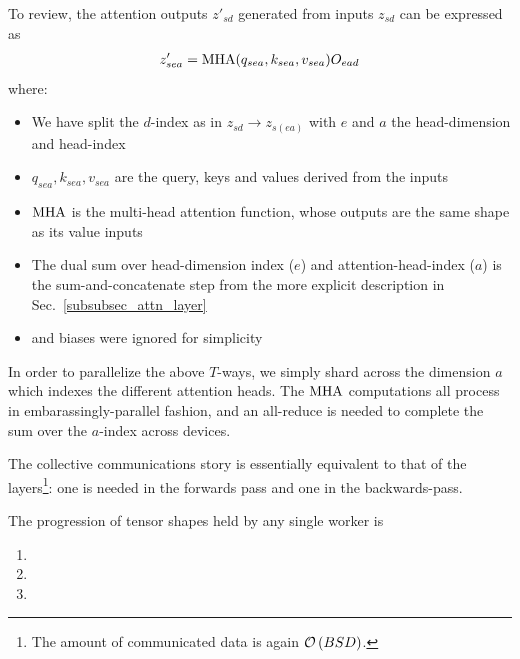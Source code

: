 \documentclass[11pt]{article}
\begin{document}
To review, the attention outputs $ z' _{ sd } $ generated from inputs $ z_{ sd } $ can be expressed
as
\begin{align}
    z' _{ sea }  &= {\rm  MHA}(q _{ sea }, k _{ sea }, v _{ sea }) O _{ ead }\nonumber\\
\end{align}
where:
\begin{itemize}
    \item  We have split the $ d $-index as in $ z _{ sd }\longrightarrow z _{ s (ea) } $ with $ e $ and
$ a $ the head-dimension and head-index
    \item $ q _{ sea }, k _{ sea }, v _{ sea }
$ are the query, keys and values derived from the inputs
    \item ${\rm
    MHA } $ is the multi-head attention function, whose outputs are the same shape as its value inputs
    \item The dual sum over head-dimension index ($ e $) and attention-head-index ($ a $) is the
    sum-and-concatenate step from the more explicit description in Sec.~\ref{subsubsec_attn_layer}
    \item {} and biases were ignored for simplicity
\end{itemize}

In order to parallelize the above $ T $-ways, we simply shard across the dimension $ a $  which
indexes the different attention heads.  The $ {\rm MHA} $ computations all process in
embarassingly-parallel fashion, and an all-reduce is needed to complete the sum over the $ a $-index
across devices.

The collective communications story is essentially
equivalent to that of the  layers\footnote{The amount of communicated data is again $ \mathcal{O} \left( BSD
\right)$. }: one  is needed in the forwards pass
and one  in the backwards-pass.

The progression of tensor shapes held by any single worker is
\begin{enumerate}
    \item {}
    \item {}
    \item {}
\end{enumerate}
\end{document}
